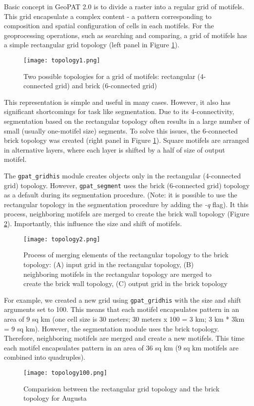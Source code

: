 
Basic concept in GeoPAT 2.0 is to divide a raster into a regular grid of motifels.
This grid encapsulate a complex content - a pattern corresponding to composition and spatial
configuration of cells in each motifels.
For the geoprocessing operations, such as searching and comparing, a grid of motifels has a simple rectangular grid topology (left panel in Figure \ref{FIG:TOPO1}). 

\begin{figure}[H]
	\centering
	\texttt{[image: topology1.png]}
	\caption{Two possible topologies for a grid of motifels: rectangular (4-connected grid) and brick (6-connected grid)}
	\label{FIG:TOPO1}
\end{figure}

This representation is simple and useful in many cases.
However, it also has significant shortcomings for task like segmentation.
Due to its 4-connectivity, segmentation based on the rectangular topology often results in a large number of small (usually one-motifel size) segments.
To solve this issues, the 6-connected brick topology was created (right panel in Figure \ref{FIG:TOPO1}).
Square motifels are arranged in alternative layers, where each layer is shifted by a half of size of output motifel.

The {\tt gpat\_gridhis} module creates objects only in the rectangular (4-connected grid) topology. 
However, {\tt gpat\_segment} uses the brick (6-connected grid) topology as a default during its segmentation procedure.
(Note: it is possible to use the rectangular topology in the segmentation procedure by adding the {\it -q} flag).
It this process, neighboring motifels are merged to create the brick wall topology (Figure \ref{FIG:TOPO2}).
Importantly, this influence the size and shift of motifels. 

\begin{figure}[H]
	\centering
	\texttt{[image: topology2.png]}
	\caption{Process of merging elements of the rectangular topology to the brick topology: (A) input grid in the rectangular topology, (B) neighboring motifels in the rectangular topology are merged to create the brick wall topology, (C) output grid in the brick topology}
	\label{FIG:TOPO2}
\end{figure}

For example, we created a new grid using {\tt gpat\_gridhis} with the size and shift arguments set to 100.
This means that each motifel encapsulates pattern in an area of 9 sq km (one cell size is 30 meters; 30 meters x 100 = 3 km; 3 km * 3km = 9 sq km).
However, the segmentation module uses the brick topology. 
Therefore, neighboring motifels are merged and create a new motifels.
This time each motifel encapsulates pattern in an area of 36 sq km (9 sq km motifels are combined into quadruples).

\begin{figure}[H]
	\centering
	\texttt{[image: topology100.png]}
	\caption{Comparision between the rectangular grid topology and the brick topology for Augusta}
	\label{FIG:TOPO3}
\end{figure}

